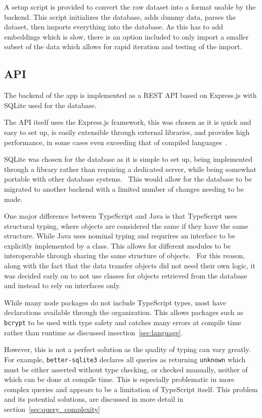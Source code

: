 A setup script is provided to convert the raw dataset into a format usable by the backend.
This script initializes the database, adds dummy data, parses the dataset, then imports everything
into the database. As this has to add embeddings which is slow, there is an option included
to only import a smaller subset of the data which allows for rapid iteration and testing of the import.

\subsection{API}

The backend of the app is implemented as a REST API based on Express.js with SQLite
used for the database.

The API itself uses the Express.js framework, this was chosen as it is quick and easy to set up, is easily extensible
through external libraries, and provides high performance, in some cases even exceeding that of
compiled languages~\cite{karlsson_performance_2021}.

SQLite was chosen for the database as it is simple to set up, being implemented through
a library rather than requiring a dedicated server, while being somewhat portable with other
database systems.~\cite{kreibich_using_2010} This would allow for the database to be migrated to
another backend with a limited number of changes needing to be made.

One major difference between TypeScript and Java is that TypeScript uses structural typing, where objects are considered
the same if they have the same structure. While Java uses nominal typing and requrires an interface to be explicitly
implemented by a class. This allows for different modules to be interoperable through sharing the same structure of objects.~\cite{gil_whiteoak_2008}
For this reason, along with the fact that the data transfer objects did not need their own logic, it was decided early on
to not use classes for objects retrieved from the database and instead to rely on interfaces only.

While many node packages do not include TypeScript types, most have declarations available through the  organization.
This allows packages such as \texttt{bcrypt} to be used with type safety and catches many errors at compile time rather than runtime as discussed
insection~\ref{sec:language}.

However, this is not a perfect solution as the quality of typing can vary greatly. For example, \texttt{better-sqlite3}
declares all queries as returning \texttt{unknown} which must be either asserted without type checking, or checked manually, neither of which
can be done at compile time. This is especially problematic in more complex queries and appears to be a limitation of TypeScript itself. This
problem and its potential solutions, are discussed in more detail in section~\ref{sec:query_complexity}


